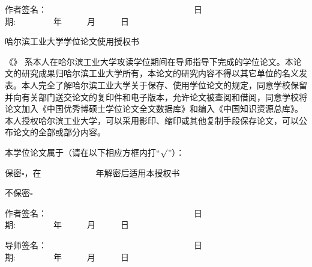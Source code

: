 \begin{flushright}

作者签名：~~~~~~~~~~~~~~~~~~~~~~~~~~~~~~~~~~~日期:~~~~~~~~~年~~~~~~月~~~~~~日~~~~

\end{flushright}

\vspace{0.4cm}
{}
\begin{center}{\subchapterstyle 哈尔滨工业大学\cxuewei 学位论文使用授权书}\end{center}

    《\chinesethesistitle》 系本人在哈尔滨工业大学攻读\cxuewei 学位期间在导师指导下完成的\cxuewei 学位论文。本论文的研究成果归哈尔滨工业大学所有，本论文的研究内容不得以其它单位的名义发表。本人完全了解哈尔滨工业大学关于保存、使用学位论文的规定，同意学校保留并向有关部门送交论文的复印件和电子版本，允许论文被查阅和借阅，同意学校将论文加入《中国优秀博硕士学位论文全文数据库》和编入《中国知识资源总库》。本人授权哈尔滨工业大学，可以采用影印、缩印或其他复制手段保存论文，可以公布论文的全部或部分内容。

\vspace{0.6cm}
本学位论文属于（请在以下相应方框内打“$\surd$”）：

保密$\square$，在~~~~~~~~~~~~~年解密后适用本授权书

不保密$\square$

\begin{flushright}{
作者签名：~~~~~~~~~~~~~~~~~~~~~~~~~~~~~~~~~~~日期:~~~~~~~~~年~~~~~~月~~~~~~日~~~~}
\end{flushright} %
\begin{flushright}{
导师签名：~~~~~~~~~~~~~~~~~~~~~~~~~~~~~~~~~~~日期:~~~~~~~~~年~~~~~~月~~~~~~日~~~~}
\end{flushright}

